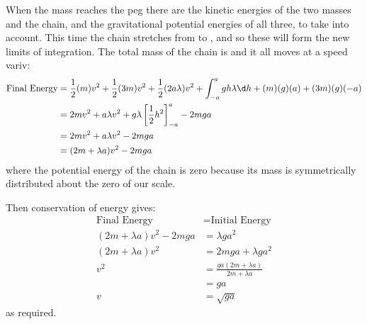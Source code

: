 \begin{problem}
{When the mass  reaches the peg there are the kinetic energies of the two masses and the chain, and the gravitational potential energies of all three, to take into account. This time the chain stretches from  to , and so these will form the new limits of integration. The total mass of the chain is  and it all moves at a speed vari{v}:
\begin{eqnarray*} 
\text{Final Energy} &= \frac{1}{2}(m)v^{2} + \frac{1}{2}(3m)v^{2} + \frac{1}{2}(2a\lambda)v^{2} + \int_{-a}^{a}gh\lambda \d h + (m)(g)(a) + (3m)(g)(-a) \\
			&= 2mv^{2} + a\lambda v^{2} + g\lambda\left[\frac{1}{2}h^{2}\right]_{-a}^{a} - 2mga \\ &= 2mv^{2} + a\lambda v^{2} - 2mga \\ 
			&= (2m + \lambda a)v^{2} - 2mga 
\end{eqnarray*}
where the potential energy of the chain is zero because its mass is symmetrically distributed about the zero of our scale.

Then conservation of energy gives:
\begin{eqnarray*} 
\text{Final Energy} &= \text{Initial Energy} \\ 
(2m + \lambda a)v^{2} - 2mga &= \lambda ga^2 \\ 
(2m + \lambda a)v^{2} &= 2mga + \lambda ga^{2} \\
	v^{2} &= \frac{ga(2m + \lambda a)}{2m + \lambda a} \\
	 &= ga \\ 
	 v &= \sqrt{ga} 
\end{eqnarray*}
as required.
}
\end{problem}